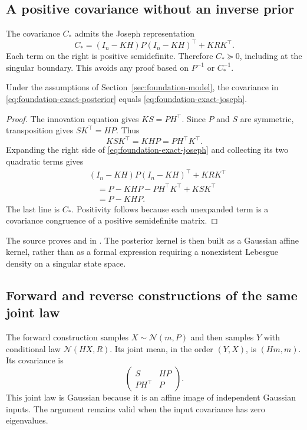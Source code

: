 \subsection{A positive covariance without an inverse prior}

The covariance $C_*$ admits the Joseph representation
\begin{equation}
 C_*=(I_n-KH)P(I_n-KH)^\top+KRK^\top.
 \label{eq:foundation-exact-joseph}
\end{equation}
Each term on the right is positive semidefinite. Therefore $C_*\succeq0$, including at the singular boundary. This avoids any proof based on $P^{-1}$ or $C_*^{-1}$.

\begin{lemma}
\label{lem:foundation-exact-joseph}
Under the assumptions of Section~\ref{sec:foundation-model}, the covariance in \eqref{eq:foundation-exact-posterior} equals \eqref{eq:foundation-exact-joseph}.
\end{lemma}
\begin{proof}
The innovation equation gives $KS=PH^\top$. Since $P$ and $S$ are symmetric, transposition gives $SK^\top=HP$. Thus
\[
 KSK^\top=KHP=PH^\top K^\top.
\]
Expanding the right side of \eqref{eq:foundation-exact-joseph} and collecting its two quadratic terms gives
\begin{align*}
 &(I_n-KH)P(I_n-KH)^\top+KRK^\top\\
 &\quad=P-KHP-PH^\top K^\top+KSK^\top\\
 &\quad=P-KHP.
\end{align*}
The last line is $C_*$. Positivity follows because each unexpanded term is a covariance congruence of a positive semidefinite matrix.
\end{proof}

The source proves  and  in . The posterior kernel is then built as a Gaussian affine kernel, rather than as a formal expression requiring a nonexistent Lebesgue density on a singular state space.

\subsection{Forward and reverse constructions of the same joint law}

The forward construction samples $X\sim\mathcal N(m,P)$ and then samples $Y$ with conditional law $\mathcal N(HX,R)$. Its joint mean, in the order $(Y,X)$, is $(Hm,m)$. Its covariance is
\begin{equation}
 \begin{pmatrix}
 S&HP\\
 PH^\top&P
 \end{pmatrix}.
 \label{eq:foundation-joint-cov}
\end{equation}
This joint law is Gaussian because it is an affine image of independent Gaussian inputs. The argument remains valid when the input covariance has zero eigenvalues.

